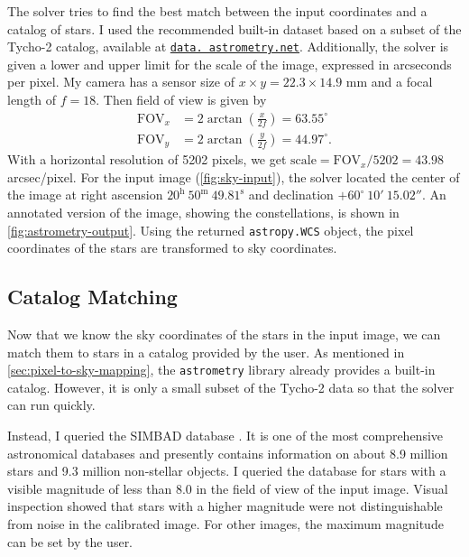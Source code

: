 The solver tries to find the best match between the input coordinates and a catalog of
stars. I used the recommended built-in dataset based on a subset of the Tycho-2 catalog,
available at \href{http://data.astrometry.net/4100/}{\texttt{data.\allowbreak
    astro\allowbreak metry.\allowbreak net}}. Additionally, the solver is given a lower and
upper limit for the scale of the image, expressed in arcseconds per pixel. My camera has a
sensor size of $x \times y = 22.3 \times 14.9$ mm and a focal length of $f = 18$. Then
field of view is given by
\begin{align*}
  \text{FOV}_x & = 2 \arctan{\left(\frac{x}{2f}\right)} = 63.55^\circ  \\
  \text{FOV}_y & = 2 \arctan{\left(\frac{y}{2f}\right)} = 44.97^\circ.
\end{align*}
With a horizontal resolution of 5202 pixels, we get $\text{scale} = \text{FOV}_x / 5202 =
  43.98$ arcsec/pixel. For the input image (\autoref{fig:sky-input}), the solver located
the center of the image at right ascension $20^\text{h}\ 50^\text{m}\ 49.81^\text{s}$
and declination $+60^\circ\ 10'\ 15.02''$. An annotated version of the image, showing
the constellations, is shown in \autoref{fig:astrometry-output}. Using the returned
\texttt{astropy.WCS} object, the pixel coordinates of the stars are transformed to sky
coordinates.

\subsection{Catalog Matching}
\label{sec:catalog-matching}

Now that we know the sky coordinates of the stars in the input image, we can match them
to stars in a catalog provided by the user. As mentioned in
\autoref{sec:pixel-to-sky-mapping}, the \texttt{astrometry} library already provides a
built-in catalog. However, it is only a small subset of the Tycho-2 data so that the
solver can run quickly.

Instead, I queried the SIMBAD database \cite{Wenger_2000}. It is one of the most
comprehensive astronomical databases and presently contains information on about 8.9
million stars and 9.3 million non-stellar objects. I queried the database for stars with a
visible magnitude of less than 8.0 in the field of view of the input image. Visual
inspection showed that stars with a higher magnitude were not distinguishable from noise
in the calibrated image. For other images, the maximum magnitude can be set by the user.

